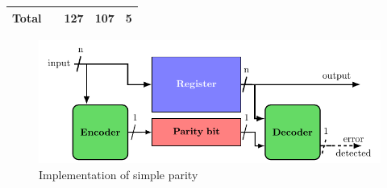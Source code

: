 \begin{table}[t]
\begin{tabular}{@{}ccccc@{}}
        Total   &                                                                                                   & 127                                                      & 107                                                                & 5                                                               \\
        \bottomrule
    \end{tabular}
\end{table}

\begin{figure}[ht]
    \centering
    \includegraphics[page=1]{c5_countermeasures_dift/img/archi_contremesures.pdf}
    \caption{Implementation of simple parity}
    \label{fig:implementation_sp}
\end{figure}






